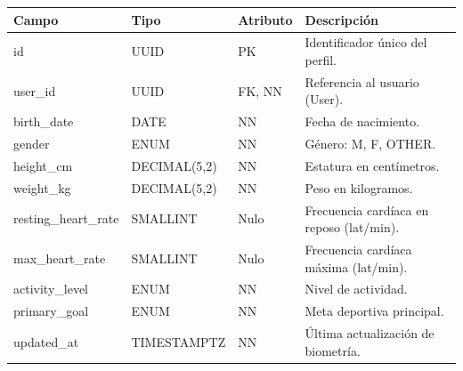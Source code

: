 \documentclass[12pt]{article}
\begin{document}
\begin{table}[h!]
    \centering
    \renewcommand{\arraystretch}{1.2}
    \small
    \begin{tabular}{|p{3.5cm}|p{2.7cm}|p{2cm}|p{6.5cm}|}
        \hline
        \rowcolor[HTML]{EFEFEF}
        \textbf{Campo} & \textbf{Tipo} & \textbf{Atributo} & \textbf{Descripción} \\ \hline
        id & UUID & PK & Identificador único del perfil. \\ \hline
        user\_id & UUID & FK, NN & Referencia al usuario (User). \\ \hline
        birth\_date & DATE & NN & Fecha de nacimiento. \\ \hline
        gender & ENUM & NN & Género: M, F, OTHER. \\ \hline
        height\_cm & DECIMAL(5,2) & NN & Estatura en centímetros. \\ \hline
        weight\_kg & DECIMAL(5,2) & NN & Peso en kilogramos. \\ \hline
        resting\_heart\_rate & SMALLINT & Nulo & Frecuencia cardíaca en reposo (lat/min). \\ \hline
        max\_heart\_rate & SMALLINT & Nulo & Frecuencia cardíaca máxima (lat/min). \\ \hline
        activity\_level & ENUM & NN & Nivel de actividad. \\ \hline
        primary\_goal & ENUM & NN & Meta deportiva principal. \\ \hline
        updated\_at & TIMESTAMPTZ & NN & Última actualización de biometría. \\ \hline
    \end{tabular}
\end{table}
\end{document}
